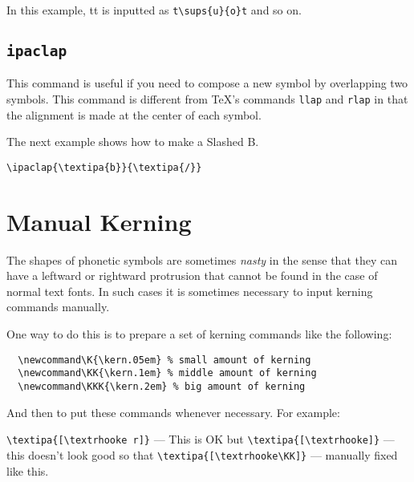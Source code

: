 In this example, tt is inputted as \verb|t\sups{u}{o}t| and so 
on.

\subsection{{\tt\tbs ipaclap}}

This command is useful if you need to compose a new symbol by
overlapping two symbols. This command is different from \TeX's
commands \texttt{\tbs llap} and \texttt{\tbs rlap} in that the
alignment is made at the center of each symbol.

The next example shows how to make a Slashed B.

\begin{tipaexample}
  \yitem \verb|\ipaclap{\textipa{b}}{\textipa{/}}|
  \yitem {}
\end{tipaexample}


\section{Manual Kerning}

The shapes of phonetic symbols are sometimes \emph{nasty} in the sense
that they can have a leftward or rightward protrusion that cannot
be found in the case of normal text fonts. In such cases it is
sometimes necessary to input kerning commands manually.

One way to do this is to prepare a set of kerning commands like the
following:

\begin{verbatim}
  \newcommand\K{\kern.05em} % small amount of kerning
  \newcommand\KK{\kern.1em} % middle amount of kerning
  \newcommand\KKK{\kern.2em} % big amount of kerning
\end{verbatim}

\newcommand\K{\kern.05em} %
\newcommand\KK{\kern.1em} %
\newcommand\KKK{\kern.2em} %

And then to put these commands whenever necessary. For example:

\begin{tipaexample}
  \yitem \verb|\textipa{[\textrhooke r]}|
  \yitem \textipa{[\textrhooke r]} --- This is OK but
  \yitem \verb|\textipa{[\textrhooke]}|
  \yitem \textipa{[\textrhooke]} --- this doesn't look good so that
  \yitem \verb|\textipa{[\textrhooke\KK]}|
  \yitem \textipa{[\textrhooke\KK]} --- manually fixed like this.
\end{tipaexample}

